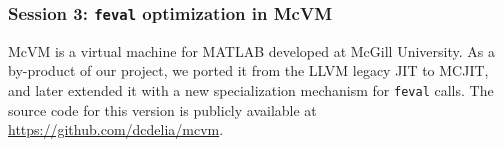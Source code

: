 
\subsubsection{Session 3: {\tt feval} optimization in McVM}

McVM is a virtual machine for MATLAB developed at McGill University. As a by-product of our project, we ported it from the LLVM legacy JIT to MCJIT, and later extended it with a new specialization mechanism for {\tt feval} calls. The source code for this version is publicly available at \url{https://github.com/dcdelia/mcvm}.



